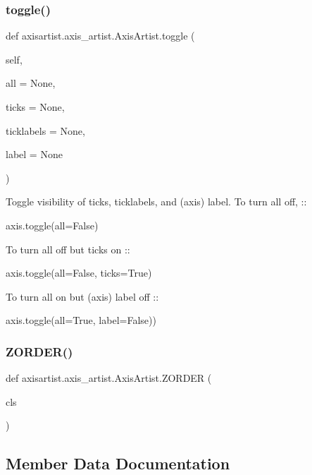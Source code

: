 \subsubsection{\texorpdfstring{toggle()}{toggle()}}
{\footnotesize\ttfamily def axisartist.\+axis\+\_\+artist.\+Axis\+Artist.\+toggle (\begin{DoxyParamCaption}\item[{}]{self,  }\item[{}]{all = {\ttfamily None},  }\item[{}]{ticks = {\ttfamily None},  }\item[{}]{ticklabels = {\ttfamily None},  }\item[{}]{label = {\ttfamily None} }\end{DoxyParamCaption})}

\begin{DoxyVerb}Toggle visibility of ticks, ticklabels, and (axis) label.
To turn all off, ::

  axis.toggle(all=False)

To turn all off but ticks on ::

  axis.toggle(all=False, ticks=True)

To turn all on but (axis) label off ::

  axis.toggle(all=True, label=False))\end{DoxyVerb}
 \mbox{\label{classaxisartist_1_1axis__artist_1_1AxisArtist_a7d6da2889a43e27a099afb942c8443d6}} 
\subsubsection{\texorpdfstring{Z\+O\+R\+D\+E\+R()}{ZORDER()}}
{\footnotesize\ttfamily def axisartist.\+axis\+\_\+artist.\+Axis\+Artist.\+Z\+O\+R\+D\+ER (\begin{DoxyParamCaption}\item[{}]{cls }\end{DoxyParamCaption})}



\subsection{Member Data Documentation}
\mbox{\label{classaxisartist_1_1axis__artist_1_1AxisArtist_af4afb04cb8a9572ce7e06c56f01d5096}} 
